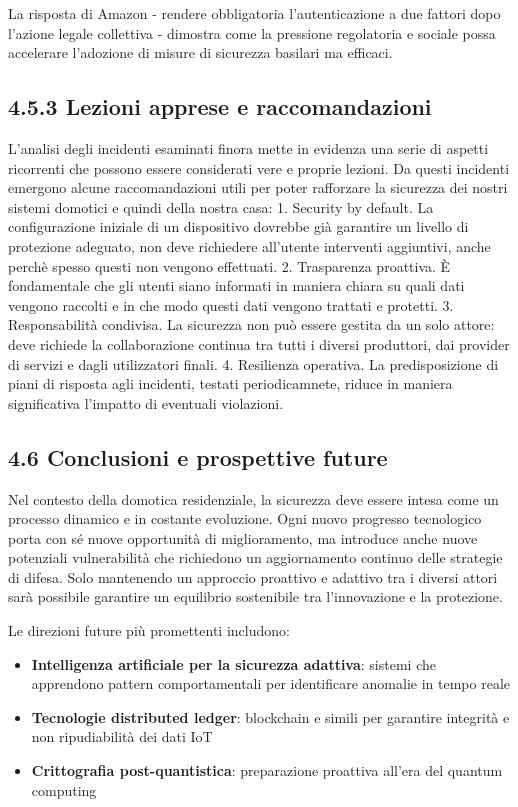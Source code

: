 La risposta di Amazon - rendere obbligatoria l'autenticazione a due fattori dopo l'azione legale collettiva - dimostra come la pressione regolatoria e sociale possa accelerare l'adozione di misure di sicurezza basilari ma efficaci.

\subsection*{4.5.3 Lezioni apprese e raccomandazioni}

L’analisi degli incidenti esaminati finora mette in evidenza una serie di aspetti ricorrenti che possono essere considerati vere e proprie lezioni. Da questi incidenti emergono alcune raccomandazioni utili per poter rafforzare la sicurezza dei nostri sistemi domotici e quindi della nostra casa:
	1.	Security by default. La configurazione iniziale di un dispositivo dovrebbe già garantire un livello di protezione adeguato, non deve  richiedere all’utente interventi aggiuntivi, anche perchè spesso questi non vengono effettuati.
	2.	Trasparenza proattiva. È fondamentale che gli utenti siano informati in maniera chiara su quali dati vengono raccolti e in che modo questi dati vengono trattati e protetti.
	3.	Responsabilità condivisa. La sicurezza non può essere gestita da un solo attore: deve richiede la collaborazione continua tra tutti i diversi produttori, dai provider di servizi e dagli utilizzatori finali.
	4.	Resilienza operativa. La predisposizione di piani di risposta agli incidenti, testati periodicamnete, riduce in maniera significativa l’impatto di eventuali violazioni.

\subsection*{4.6 Conclusioni e prospettive future}

Nel contesto della domotica residenziale, la sicurezza deve essere intesa come un processo dinamico e in costante evoluzione. Ogni nuovo progresso tecnologico porta con sé nuove opportunità di miglioramento, ma introduce anche nuove potenziali vulnerabilità che richiedono un aggiornamento continuo delle strategie di difesa. Solo mantenendo un approccio proattivo  e adattivo tra i diversi attori sarà possibile garantire un equilibrio sostenibile tra l'innovazione e la protezione.

Le direzioni future più promettenti includono:

\begin{itemize}
    \item \textbf{Intelligenza artificiale per la sicurezza adattiva}: sistemi che apprendono pattern comportamentali per identificare anomalie in tempo reale
    \item \textbf{Tecnologie distributed ledger}: blockchain e simili per garantire integrità e non ripudiabilità dei dati IoT
    \item \textbf{Crittografia post-quantistica}: preparazione proattiva all'era del quantum computing
\end{itemize}

